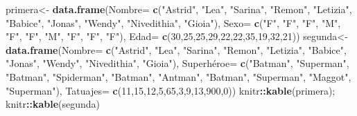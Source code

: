 \documentclass[
]{book}
\newenvironment{Shaded}{\begin{snugshade}}{\end{snugshade}}
\newcommand{\AttributeTok}[1]{\textcolor[rgb]{0.13,0.29,0.53}{#1}}
\newcommand{\DecValTok}[1]{\textcolor[rgb]{0.00,0.00,0.81}{#1}}
\newcommand{\FunctionTok}[1]{\textcolor[rgb]{0.13,0.29,0.53}{\textbf{#1}}}
\newcommand{\NormalTok}[1]{#1}
\newcommand{\OtherTok}[1]{\textcolor[rgb]{0.56,0.35,0.01}{#1}}
\newcommand{\SpecialCharTok}[1]{\textcolor[rgb]{0.81,0.36,0.00}{\textbf{#1}}}
\newcommand{\StringTok}[1]{\textcolor[rgb]{0.31,0.60,0.02}{#1}}
\begin{document}
\begin{Shaded}
\begin{Highlighting}[]
\NormalTok{primera}\OtherTok{\textless{}{-}} \FunctionTok{data.frame}\NormalTok{(}\AttributeTok{Nombre=} \FunctionTok{c}\NormalTok{(}\StringTok{"Astrid"}\NormalTok{, }\StringTok{"Lea"}\NormalTok{, }\StringTok{"Sarina"}\NormalTok{, }\StringTok{"Remon"}\NormalTok{, }\StringTok{"Letizia"}\NormalTok{, }
                               \StringTok{"Babice"}\NormalTok{, }\StringTok{"Jonas"}\NormalTok{, }\StringTok{"Wendy"}\NormalTok{, }\StringTok{"Nivedithia"}\NormalTok{, }\StringTok{"Gioia"}\NormalTok{),}
                     \AttributeTok{Sexo=} \FunctionTok{c}\NormalTok{(}\StringTok{"F"}\NormalTok{, }\StringTok{"F"}\NormalTok{, }\StringTok{"F"}\NormalTok{, }\StringTok{"M"}\NormalTok{, }\StringTok{"F"}\NormalTok{, }\StringTok{"F"}\NormalTok{, }\StringTok{"M"}\NormalTok{, }\StringTok{"F"}\NormalTok{, }\StringTok{"F"}\NormalTok{, }\StringTok{"F"}\NormalTok{),}
                     \AttributeTok{Edad=} \FunctionTok{c}\NormalTok{(}\DecValTok{30}\NormalTok{,}\DecValTok{25}\NormalTok{,}\DecValTok{25}\NormalTok{,}\DecValTok{29}\NormalTok{,}\DecValTok{22}\NormalTok{,}\DecValTok{22}\NormalTok{,}\DecValTok{35}\NormalTok{,}\DecValTok{19}\NormalTok{,}\DecValTok{32}\NormalTok{,}\DecValTok{21}\NormalTok{))}
\NormalTok{segunda}\OtherTok{\textless{}{-}} \FunctionTok{data.frame}\NormalTok{(}\AttributeTok{Nombre=} \FunctionTok{c}\NormalTok{(}\StringTok{"Astrid"}\NormalTok{, }\StringTok{"Lea"}\NormalTok{, }\StringTok{"Sarina"}\NormalTok{, }\StringTok{"Remon"}\NormalTok{, }\StringTok{"Letizia"}\NormalTok{, }
                               \StringTok{"Babice"}\NormalTok{, }\StringTok{"Jonas"}\NormalTok{, }\StringTok{"Wendy"}\NormalTok{, }\StringTok{"Nivedithia"}\NormalTok{, }\StringTok{"Gioia"}\NormalTok{),}
\NormalTok{                     Superhéroe}\OtherTok{=} \FunctionTok{c}\NormalTok{(}\StringTok{"Batman"}\NormalTok{, }\StringTok{"Superman"}\NormalTok{, }\StringTok{"Batman"}\NormalTok{, }\StringTok{"Spiderman"}\NormalTok{, }\StringTok{"Batman"}\NormalTok{, }
                                   \StringTok{"Antman"}\NormalTok{, }\StringTok{"Batman"}\NormalTok{, }\StringTok{"Superman"}\NormalTok{, }\StringTok{"Maggot"}\NormalTok{, }\StringTok{"Superman"}\NormalTok{),}
                     \AttributeTok{Tatuajes=} \FunctionTok{c}\NormalTok{(}\DecValTok{11}\NormalTok{,}\DecValTok{15}\NormalTok{,}\DecValTok{12}\NormalTok{,}\DecValTok{5}\NormalTok{,}\DecValTok{65}\NormalTok{,}\DecValTok{3}\NormalTok{,}\DecValTok{9}\NormalTok{,}\DecValTok{13}\NormalTok{,}\DecValTok{900}\NormalTok{,}\DecValTok{0}\NormalTok{))}
\NormalTok{knitr}\SpecialCharTok{::}\FunctionTok{kable}\NormalTok{(primera); knitr}\SpecialCharTok{::}\FunctionTok{kable}\NormalTok{(segunda)}
\end{Highlighting}
\end{Shaded}
\end{document}
